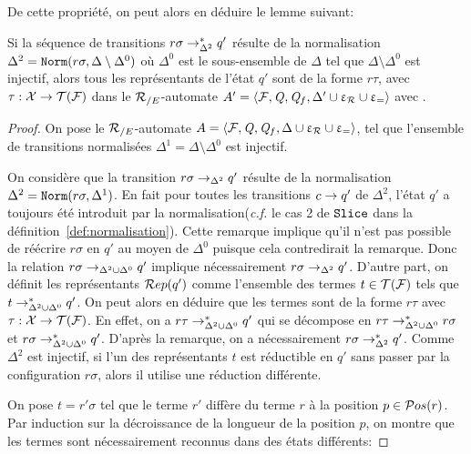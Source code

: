 De cette propriété, on peut alors en déduire le lemme suivant: 
\begin{property}
  \label{prop:norm_representant}
  Si la séquence de transitions $r\sigma \rightarrow_{\Delta^2}^* q'$ résulte de la normalisation $\Delta^2=\mathtt{Norm}(r\sigma, \Delta \setminus \Delta^0)$
  où $\Delta^0$ est le sous-ensemble de $\Delta$ tel que  $\Delta \setminus \Delta^0$ est injectif,
  alors tous les représentants de l'état $q'$ sont de la forme $r\tau$, avec $\tau: \mathcal X \rightarrow \mathcal{T(F)}$ dans le ${\mathcal R_{/E}}$-automate 
  $A' = \langle \mathcal{F}, \mathit Q, \mathit Q_f, \Delta' \cup \upvarepsilon_{\mathcal R} \cup \upvarepsilon_{=}\rangle$ avec \Delta .
\end{property}

\begin{proof}
  On pose le ${\mathcal R_{/E}}$-automate $A = \langle \mathcal{F}, \mathit Q, \mathit Q_f, \Delta \cup \upvarepsilon_{\mathcal R} \cup \upvarepsilon_{=}\rangle$,
  tel que l'ensemble de transitions normalisées $\Delta^1 = \Delta \setminus \Delta^0$ est injectif.
  
  On considère que la transition $r\sigma \rightarrow_{\Delta^2} q'$ résulte de la normalisation $\Delta^2=\mathtt{Norm}(r\sigma, \Delta^1)$.
  En fait pour toutes les transitions $c \rightarrow q'$ de $\Delta^2$, l'état $q'$ a toujours été introduit 
  par la normalisation(\textit{c.f.} le cas 2 de $\mathtt{Slice}$ dans la définition~\ref{def:normalisation}). Cette remarque implique
  qu'il n'est pas possible de réécrire $r\sigma$ en $q'$ au moyen de $\Delta^0$ puisque cela contredirait
  la remarque. Donc la relation $r\sigma \rightarrow_{\Delta^2 \cup \Delta^0} q'$ implique nécessairement $r\sigma \rightarrow_{\Delta^2} q'$.
  D'autre part, on définit les représentants $\mathcal R ep(q')$ comme l'ensemble des termes $t \in \mathcal{T(F)}$ tels que $t \rightarrow^*_{\Delta^2 \cup \Delta^0} q'$.
  On peut alors en déduire que les termes sont de la forme $r\tau$ avec $\tau: \mathcal X \rightarrow \mathcal{T(F)}$.
  En effet, on a $r\tau\rightarrow^*_{\Delta^2 \cup \Delta^0} q'$ qui se décompose en $r\tau\rightarrow^*_{\Delta^2 \cup \Delta^0} r\sigma$
  et $r\sigma \rightarrow^*_{\Delta^2 \cup \Delta^0} q'$. D'après la remarque, on a nécessairement $r\sigma \rightarrow^*_{\Delta^2} q'$.
  Comme $\Delta^2$ est injectif, si l'un des représentants $t$ est réductible en $q'$ sans passer par la configuration 
  $r\sigma$, alors il utilise une réduction différente. 

  On pose $t = r'\sigma$ tel que le terme $r'$ diffère du terme $r$ à la position $p\in \mathcal{ P}os(r)$.
  Par induction sur la décroissance de la longueur de la position $p$, 
  on montre que les termes sont nécessairement reconnus dans des états différents:


\end{proof}
